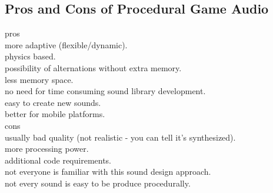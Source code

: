 \subsection{Pros and Cons of Procedural Game Audio}
pros\\
more adaptive (flexible/dynamic).\\
physics based.\\
possibility of alternations without extra memory.\\
less memory space.\\
no need for time consuming sound library development.\\
easy to create new sounds.\\
better for mobile platforms.\\

cons\\
usually bad quality (not realistic - you can tell it's synthesized).\\
more processing power.\\
additional code requirements.\\
not everyone is familiar with this sound design approach.\\
not every sound is easy to be produce procedurally.\\
